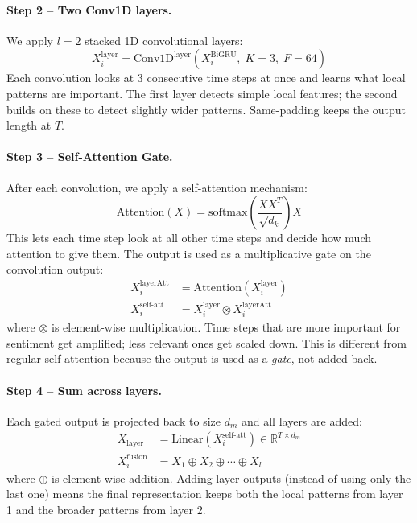 \documentclass[11pt,twocolumn]{article}
\begin{document}
\paragraph{Step 2 -- Two Conv1D layers.}
We apply $l = 2$ stacked 1D convolutional layers:
\begin{equation}
X_i^{\text{layer}} = \text{Conv1D}^{\text{layer}}\!\left(X_i^{\text{BiGRU}},\; K{=}3,\; F{=}64\right)
\end{equation}
Each convolution looks at 3 consecutive time steps at once and learns what local patterns are important. The first layer detects simple local features; the second builds on these to detect slightly wider patterns. Same-padding keeps the output length at $T$.

\paragraph{Step 3 -- Self-Attention Gate.}
After each convolution, we apply a self-attention mechanism:
\begin{equation}
\text{Attention}(X) = \text{softmax}\!\left(\frac{X X^T}{\sqrt{d_k}}\right) X
\end{equation}
This lets each time step look at all other time steps and decide how much attention to give them. The output is used as a multiplicative gate on the convolution output:
\begin{align}
X_i^{\text{layerAtt}} &= \text{Attention}(X_i^{\text{layer}}) \\
X_i^{\text{self-att}} &= X_i^{\text{layer}} \otimes X_i^{\text{layerAtt}}
\end{align}
where $\otimes$ is element-wise multiplication. Time steps that are more important for sentiment get amplified; less relevant ones get scaled down. This is different from regular self-attention because the output is used as a \emph{gate}, not added back.

\paragraph{Step 4 -- Sum across layers.}
Each gated output is projected back to size $d_m$ and all layers are added:
\begin{align}
X_{\text{layer}} &= \text{Linear}(X_i^{\text{self-att}}) \in \mathbb{R}^{T \times d_m} \\
X_i^{\text{fusion}} &= X_1 \oplus X_2 \oplus \cdots \oplus X_l
\end{align}
where $\oplus$ is element-wise addition. Adding layer outputs (instead of using only the last one) means the final representation keeps both the local patterns from layer 1 and the broader patterns from layer 2.
\end{document}
